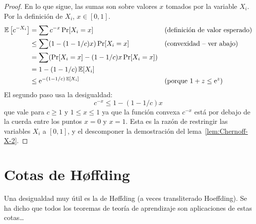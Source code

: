   \begin{proof}
    En lo que sigue,
    las sumas son sobre valores \(x\) tomados por la variable \(X_i\).
    Por la definición de \(X_i\),
    \(x \in [0, 1]\).
    \begin{align*}
      \operatorname{\mathbb{E}}\left[ c^{-X_i} \right]
        &=   \sum c^{-x} \Pr[X_i = x]
                && \text{(definición de valor esperado)} \\
        &\le \sum (1 - (1 - 1 / c) x) \Pr[X_i = x]
                && \text{(convexidad -- ver abajo)} \\
        &=   \sum ( \Pr[X_i = x] - (1 - 1/ c) x \Pr[X_i = x] ) \\
        &=   1 - (1 - 1 / c) \operatorname{\mathbb{E}}[X_i] \\
        &\le \mathrm{e}^{- (1 - 1 / c) \operatorname{\mathbb{E}}[X_i]}
                && \text{(porque \(1 + z \le \mathrm{e}^z\))}
    \end{align*}
    El segundo paso usa la desigualdad:
    \begin{equation*}
      c^{-x}
        \le 1 - (1 - 1 / c) x
    \end{equation*}
    que vale para \(c \ge 1\) y \(1 \le x \le 1\)
    ya que la función convexa \(c^{-x}\)
    está por debajo de la cuerda entre los puntos \(x = 0\) y \(x = 1\).
    Esta es la razón de restringir las variables \(X_i\) a \([0, 1]\),
    y el descomponer
    la demostración del lema~\ref{lem:Chernoff-X-2}.
  \end{proof}

\section{Cotas de Høffding}
\label{sec:Hoeffding-inequality}

  Una desigualdad muy útil es la de Høffding
  (a veces transliterado Hoeffding).
  Se ha dicho que todos los teoremas de teoría de aprendizaje
  son aplicaciones de estas cotas\ldots

